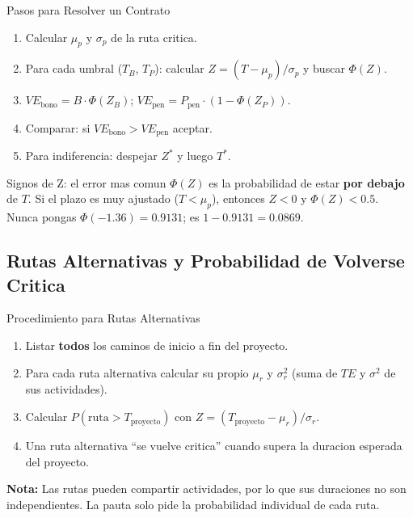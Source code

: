 \documentclass[11pt, a4paper]{article}
\begin{document}
\begin{tipprueba}{Pasos para Resolver un Contrato}
  \begin{enumerate}[leftmargin=1.5em, itemsep=2pt]
    \item Calcular $\mu_p$ y $\sigma_p$ de la ruta critica.
    \item Para cada umbral ($T_B$, $T_P$): calcular $Z = (T - \mu_p)/\sigma_p$ y buscar $\Phi(Z)$.
    \item $VE_{\text{bono}} = B \cdot \Phi(Z_B)$; $VE_{\text{pen}} = P_{\text{pen}} \cdot (1 - \Phi(Z_P))$.
    \item Comparar: si $VE_{\text{bono}} > VE_{\text{pen}}$ aceptar.
    \item Para indiferencia: despejar $Z^*$ y luego $T^*$.
  \end{enumerate}
\end{tipprueba}

\begin{trampa}{Signos de Z: el error mas comun}
  $\Phi(Z)$ es la probabilidad de estar \textbf{por debajo} de $T$.
  Si el plazo es muy ajustado ($T < \mu_p$), entonces $Z < 0$ y $\Phi(Z) < 0.5$.
  Nunca pongas $\Phi(-1.36) = 0.9131$; es $1 - 0.9131 = 0.0869$.
\end{trampa}

\subsection[Rutas Alternativas]{Rutas Alternativas y Probabilidad de Volverse Critica}

\begin{tipprueba}{Procedimiento para Rutas Alternativas}
  \begin{enumerate}[leftmargin=1.5em, itemsep=2pt]
    \item Listar \textbf{todos} los caminos de inicio a fin del proyecto.
    \item Para cada ruta alternativa calcular su propio $\mu_r$ y $\sigma_r^2$
          (suma de $TE$ y $\sigma^2$ de sus actividades).
    \item Calcular $P(\text{ruta} > T_{\text{proyecto}})$ con
          $Z = (T_{\text{proyecto}} - \mu_r)/\sigma_r$.
    \item Una ruta alternativa ``se vuelve critica'' cuando supera la duracion
          esperada del proyecto.
  \end{enumerate}

  \textbf{Nota:} Las rutas pueden compartir actividades, por lo que sus duraciones
  no son independientes. La pauta solo pide la probabilidad individual de cada ruta.
\end{tipprueba}
\end{document}
